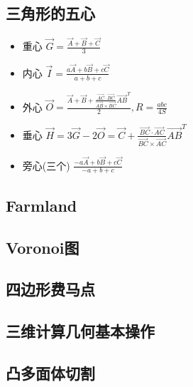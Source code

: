 \documentclass[10pt, a4paper]{article}
\begin{document}
  \subsection{三角形的五心}
    \begin{itemize}
    \item
      重心 $\overrightarrow{G} = \frac{\overrightarrow{A} + \overrightarrow{B} + \overrightarrow{C}}{3}$
    \item
      内心 $\overrightarrow{I} = \frac{a\overrightarrow{A} + b\overrightarrow{B} + c\overrightarrow{C}}{a + b + c}$
    \item
      外心 $\overrightarrow{O} = \frac{\overrightarrow{A} + \overrightarrow{B} + \frac{\overrightarrow{AC} \cdot \overrightarrow{BC}}{\overrightarrow{AB} \times \overrightarrow{BC}} \overrightarrow{AB}^{T}}{2}, R = \frac{abc}{4S}$
    \item
      垂心 $\overrightarrow{H} = 3\overrightarrow{G} - 2\overrightarrow{O} = \overrightarrow{C} + \frac{\overrightarrow{BC} \cdot \overrightarrow{AC}}{\overrightarrow{BC} \times \overrightarrow{AC}} \overrightarrow{AB} ^ {T}$
    \item
      旁心(三个) $\frac{-a\overrightarrow{A} + b\overrightarrow{B} + c\overrightarrow{C}}{-a + b + c}$
    \end{itemize}

  \subsection{Farmland}
    

  \subsection{Voronoi图}
    

  \subsection{四边形费马点}
    

  \subsection{三维计算几何基本操作}
    

  \subsection{凸多面体切割}
    
\end{document}
